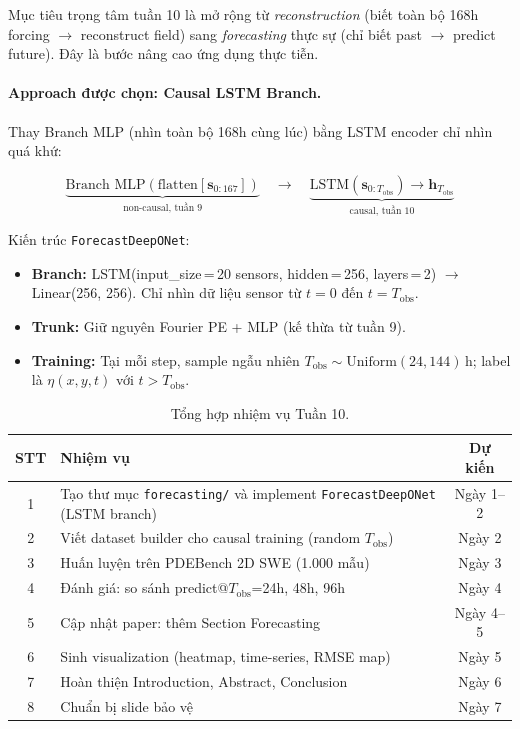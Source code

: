 \documentclass[12pt,a4paper]{article}
\begin{document}
Mục tiêu trọng tâm tuần 10 là mở rộng từ \emph{reconstruction} (biết toàn bộ 168h forcing $\to$ reconstruct field) sang \emph{forecasting} thực sự (chỉ biết past $\to$ predict future). Đây là bước nâng cao ứng dụng thực tiễn.

\paragraph{Approach được chọn: Causal LSTM Branch.}
Thay Branch MLP (nhìn toàn bộ 168h cùng lúc) bằng LSTM encoder chỉ nhìn quá khứ:

\begin{equation}
  \underbrace{\text{Branch MLP}(\text{flatten}[\mathbf{s}_{0:167}])}_{\text{non-causal, tuần 9}}
  \quad\longrightarrow\quad
  \underbrace{\text{LSTM}(\mathbf{s}_{0:T_{\text{obs}}}) \to \mathbf{h}_{T_{\text{obs}}}}_{\text{causal, tuần 10}}
\end{equation}

Kiến trúc \texttt{ForecastDeepONet}:
\begin{itemize}[nosep]
  \item \textbf{Branch:} LSTM(input\_size\,=\,20 sensors, hidden\,=\,256, layers\,=\,2) $\to$ Linear(256, 256). Chỉ nhìn dữ liệu sensor từ $t=0$ đến $t=T_{\text{obs}}$.
  \item \textbf{Trunk:} Giữ nguyên Fourier PE + MLP (kế thừa từ tuần 9).
  \item \textbf{Training:} Tại mỗi step, sample ngẫu nhiên $T_{\text{obs}} \sim \text{Uniform}(24, 144)$\,h; label là $\eta(x,y,t)$ với $t > T_{\text{obs}}$.
\end{itemize}

\begin{table}[ht]
  \centering
  \caption{Tổng hợp nhiệm vụ Tuần 10.}
  \label{tab:tasks10}
  \begin{tabular}{@{}clc@{}}
    \toprule
    \textbf{STT} & \textbf{Nhiệm vụ} & \textbf{Dự kiến} \\
    \midrule
    1 & Tạo thư mục \texttt{forecasting/} và implement \texttt{ForecastDeepONet} (LSTM branch) & Ngày 1--2 \\
    2 & Viết dataset builder cho causal training (random $T_{\text{obs}}$) & Ngày 2 \\
    3 & Huấn luyện trên PDEBench 2D SWE (1.000 mẫu) & Ngày 3 \\
    4 & Đánh giá: so sánh predict@$T_{\text{obs}}$=24h, 48h, 96h & Ngày 4 \\
    5 & Cập nhật paper: thêm Section Forecasting & Ngày 4--5 \\
    6 & Sinh visualization (heatmap, time-series, RMSE map) & Ngày 5 \\
    7 & Hoàn thiện Introduction, Abstract, Conclusion & Ngày 6 \\
    8 & Chuẩn bị slide bảo vệ & Ngày 7 \\
    \bottomrule
  \end{tabular}
\end{table}
\end{document}
